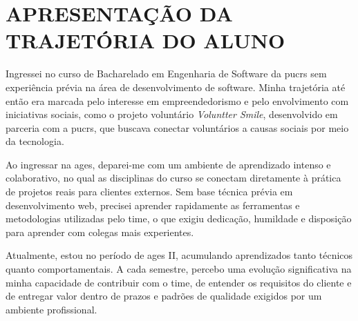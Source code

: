 \chapter[APRESENTAÇÃO DA TRAJETÓRIA DO ALUNO]{APRESENTAÇÃO DA TRAJETÓRIA DO ALUNO}

Ingressei no curso de Bacharelado em Engenharia de Software da \ac{pucrs} sem experiência
prévia na área de desenvolvimento de software. Minha trajetória até então era marcada pelo
interesse em empreendedorismo e pelo envolvimento com iniciativas sociais, como o projeto
voluntário \textit{Voluntter Smile}, desenvolvido em parceria com a \ac{pucrs}, que buscava
conectar voluntários a causas sociais por meio da tecnologia.

Ao ingressar na \ac{ages}, deparei-me com um ambiente de aprendizado intenso e colaborativo,
no qual as disciplinas do curso se conectam diretamente à prática de projetos reais para
clientes externos. Sem base técnica prévia em desenvolvimento web, precisei aprender
rapidamente as ferramentas e metodologias utilizadas pelo time, o que exigiu dedicação,
humildade e disposição para aprender com colegas mais experientes.

Atualmente, estou no período de \ac{ages} II, acumulando aprendizados tanto técnicos
quanto comportamentais. A cada semestre, percebo uma evolução significativa na minha
capacidade de contribuir com o time, de entender os requisitos do cliente e de entregar
valor dentro de prazos e padrões de qualidade exigidos por um ambiente profissional.
    